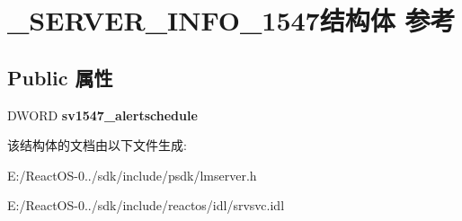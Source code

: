 \hypertarget{struct___s_e_r_v_e_r___i_n_f_o__1547}{}\section{\+\_\+\+S\+E\+R\+V\+E\+R\+\_\+\+I\+N\+F\+O\+\_\+1547结构体 参考}
\label{struct___s_e_r_v_e_r___i_n_f_o__1547}
\subsection*{Public 属性}
\begin{DoxyCompactItemize}
\item 
\mbox{\label{struct___s_e_r_v_e_r___i_n_f_o__1547_a5fb42650f026ada5c5e30cd7db65180a}} 
D\+W\+O\+RD {\bfseries sv1547\+\_\+alertschedule}
\end{DoxyCompactItemize}


该结构体的文档由以下文件生成\+:\begin{DoxyCompactItemize}
\item 
E\+:/\+React\+O\+S-\/0../sdk/include/psdk/lmserver.\+h\item 
E\+:/\+React\+O\+S-\/0../sdk/include/reactos/idl/srvsvc.\+idl\end{DoxyCompactItemize}
